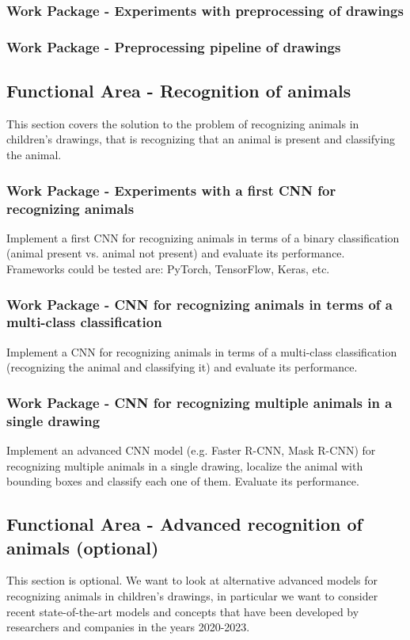 \subsubsection{Work Package - Experiments with preprocessing of drawings}
\subsubsection{Work Package - Preprocessing pipeline of drawings}

\subsection{Functional Area - Recognition of animals}
This section covers the solution to the problem of recognizing animals in children's drawings, that is recognizing that an animal is present and classifying the animal.

\subsubsection{Work Package - Experiments with a first CNN for recognizing animals}
Implement a first CNN for recognizing animals in terms of a binary classification (animal present vs. animal not present) and evaluate its performance.
Frameworks could be tested are: PyTorch, TensorFlow, Keras, etc.
\subsubsection{Work Package - CNN for recognizing animals in terms of a multi-class classification}
Implement a CNN for recognizing animals in terms of a multi-class classification (recognizing the animal and classifying it) and evaluate its performance.
\subsubsection{Work Package - CNN for recognizing multiple animals in a single drawing}
Implement an advanced CNN model (e.g. Faster R-CNN, Mask R-CNN) for recognizing multiple animals in a single drawing, localize the animal with bounding boxes and classify each one of them. Evaluate its performance.
\subsection{Functional Area - Advanced recognition of animals (optional)}
This section is optional. We want to look at alternative advanced models for recognizing animals in children's drawings, in particular we want to consider recent state-of-the-art models and concepts that have been developed by researchers and companies in the years 2020-2023.

